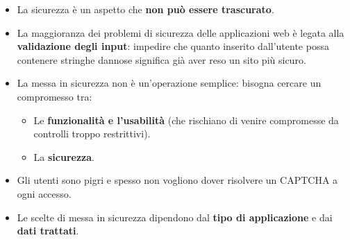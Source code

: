 \begin{itemize}
    \item La sicurezza è un aspetto che \textbf{non può essere trascurato}.
    \item La maggioranza dei problemi di sicurezza delle applicazioni web è legata alla \textbf{validazione degli input}: impedire che quanto inserito dall'utente possa contenere stringhe dannose significa già aver reso un sito più sicuro.
    \item La messa in sicurezza non è un'operazione semplice: bisogna cercare un compromesso tra:
    \begin{itemize}
        \item Le \textbf{funzionalità e l'usabilità} (che rischiano di venire compromesse da controlli troppo restrittivi).
        \item La \textbf{sicurezza}.
    \end{itemize}
    \item Gli utenti sono pigri e spesso non vogliono dover risolvere un CAPTCHA a ogni accesso.
    \item Le scelte di messa in sicurezza dipendono dal \textbf{tipo di applicazione} e dai \textbf{dati trattati}.
\end{itemize}
